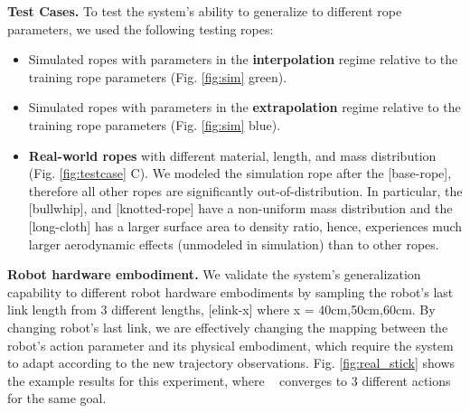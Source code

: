 \textbf{Test Cases.}
To test the system's ability to generalize to different rope parameters, we used the following testing ropes: 
\begin{itemize}[leftmargin=*]
    \item Simulated ropes with parameters in the \textbf{interpolation} regime relative to the training rope parameters (Fig. \ref{fig:sim} green).
    \item Simulated ropes with parameters in the \textbf{extrapolation} regime relative to the training rope parameters (Fig. \ref{fig:sim} blue).
    \item \textbf{Real-world ropes} with different material, length, and mass distribution (Fig. \ref{fig:testcase} C). We modeled the simulation rope after the [base-rope], therefore all other ropes  are significantly out-of-distribution. In particular, the [bullwhip], and [knotted-rope] have a non-uniform mass distribution and the [long-cloth] has a larger surface area to density ratio, hence, experiences much larger aerodynamic effects (unmodeled in simulation) than to other ropes.     
\end{itemize}

\textbf{Robot hardware embodiment.} We validate the system's generalization capability to different robot hardware embodiments by sampling the robot's last link length from 3 different lengths, [elink-x] where x = 40cm,50cm,60cm. By changing robot's last link, we are effectively changing the mapping between the robot's action parameter and its physical embodiment, which require the system to adapt according to the new trajectory observations. Fig. \ref{fig:real_stick} shows the example results for this experiment, where \names~ converges to 3 different actions for the same goal.







